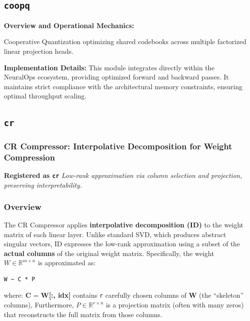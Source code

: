 \subsection{\texttt{coopq}}
\textbf{Overview and Operational Mechanics:}

Cooperative Quantization optimizing shared codebooks across multiple factorized linear projection heads.

\textbf{Implementation Details:}
This module integrates directly within the NeuralOps ecosystem, providing optimized forward and backward passes. It maintains strict compliance with the architectural memory constraints, ensuring optimal throughput scaling.

\subsection{\texttt{cr}}
\subsubsection*{CR Compressor: Interpolative Decomposition for Weight Compression}

\textbf{Registered as \texttt{cr}}
\textit{Low-rank approximation via column selection and projection, preserving interpretability.}


\subsubsection*{Overview}

The CR Compressor applies \textbf{interpolative decomposition (ID)} to the weight matrix of each linear layer. Unlike standard SVD, which produces abstract singular vectors, ID expresses the low-rank approximation using a subset of the \textbf{actual columns} of the original weight matrix. Specifically, the weight $W \in \mathbb{R}^{m \times n}$ is approximated as:

\vspace{0.5em}
\begin{mdframed}[backgroundcolor=codebg, linecolor=codeframe, linewidth=1pt, roundcorner=4pt, innerleftmargin=2pt, innerrightmargin=5pt, innertopmargin=5pt, innerbottommargin=5pt]
\begin{lstlisting}
W ~ C * P
\end{lstlisting}
\end{mdframed}
\vspace{0.5em}

where:
\textbf{C} = \textbf{W[:, idx]} contains \texttt{r} carefully chosen columns of \textbf{W} (the ``skeleton'' columns), Furthermore, $P \in \mathbb{R}^{r \times n}$ is a projection matrix (often with many zeros) that reconstructs the full matrix from those columns.


